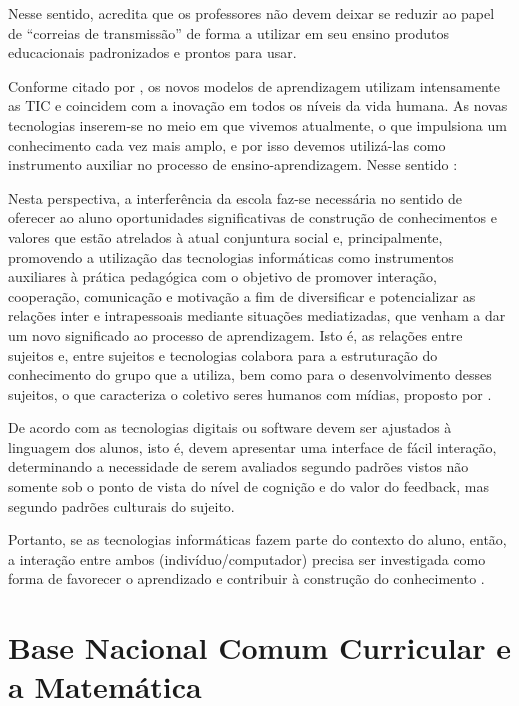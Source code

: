 Nesse sentido,  acredita que os professores não devem deixar se reduzir ao papel de “correias de transmissão” de forma a utilizar em seu ensino produtos educacionais padronizados e prontos para usar.


Conforme citado por , os novos modelos de aprendizagem utilizam intensamente as TIC e coincidem com a inovação em todos os níveis da vida humana. As novas tecnologias inserem-se no meio em que vivemos atualmente, o que impulsiona um conhecimento cada vez mais amplo, e por isso devemos utilizá-las como instrumento auxiliar no processo de ensino-aprendizagem. Nesse sentido \cite{richit2004implicaccoes}:

\begin{citacao}
Nesta perspectiva, a interferência da escola faz-se necessária no sentido de oferecer ao aluno oportunidades significativas de construção de conhecimentos e valores que estão atrelados à atual conjuntura social e, principalmente, promovendo a utilização das tecnologias informáticas como instrumentos auxiliares à prática pedagógica com o objetivo de promover interação, cooperação, comunicação e motivação a fim de diversificar e potencializar as relações inter e intrapessoais mediante situações mediatizadas, que venham a dar um novo significado ao processo de aprendizagem. Isto é, as relações entre sujeitos e, entre sujeitos e tecnologias colabora para a estruturação do conhecimento do grupo que a utiliza, bem como para o desenvolvimento desses sujeitos, o que caracteriza o coletivo seres humanos com mídias, proposto por .
\end{citacao}

De acordo com  as tecnologias digitais ou software devem ser ajustados à linguagem dos alunos, isto é, devem apresentar uma interface de fácil interação, determinando a necessidade de serem avaliados segundo padrões vistos não somente sob o ponto de vista do nível de cognição e do valor do feedback, mas segundo padrões culturais do sujeito.

Portanto, se as tecnologias informáticas fazem parte do contexto do aluno, então, a interação entre ambos (indivíduo/computador) precisa ser investigada como forma de favorecer o aprendizado e contribuir à construção do conhecimento \cite{richit2004implicaccoes}.





\section{Base Nacional Comum Curricular e a Matemática}
\label{bncc_mat}


